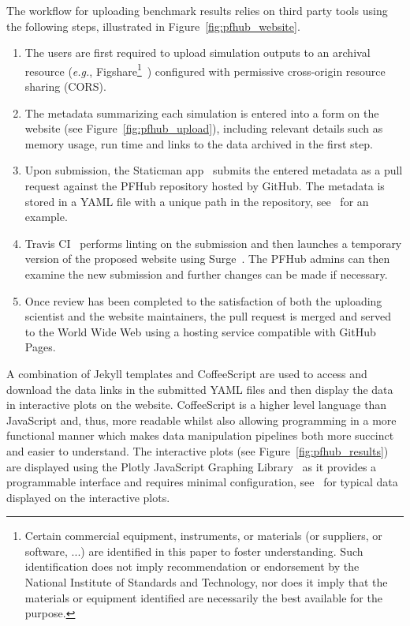 \documentclass{jors}
\begin{document}
The workflow for uploading benchmark results relies on third party
tools using the following steps, illustrated in
Figure~\ref{fig:pfhub_website}.
\begin{enumerate}
  \item The users are first required to upload simulation outputs to
    an archival resource (\emph{e.g.}, Figshare\footnote{Certain
      commercial equipment, instruments, or materials (or suppliers,
      or software, ...) are identified in this paper to foster
      understanding. Such identification does not imply recommendation
      or endorsement by the National Institute of Standards and
      Technology, nor does it imply that the materials or equipment
      identified are necessarily the best available for the
      purpose.\label{disclaimer}}~\cite{figshare}) configured with
    permissive cross-origin resource sharing (CORS).
  \item The metadata summarizing each simulation is entered into a
    form on the website (see Figure~\ref{fig:pfhub_upload}), including
    relevant details such as memory usage, run time and links to the
    data archived in the first step.
  \item Upon submission, the Staticman app~\cite{staticman} submits
    the entered metadata as a pull request against the PFHub
    repository hosted by GitHub. The metadata is stored in a YAML file
    with a unique path in the repository, see~\cite{upload_data} for
    an example.
  \item Travis CI~\cite{travis} performs linting on the submission and
    then launches a temporary version of the proposed website using
    Surge~\cite{surge}. The PFHub admins can then examine the new
    submission and further changes can be made if necessary.
  \item Once review has been completed to the satisfaction of both the
    uploading scientist and the website maintainers, the pull request
    is merged and served to the World Wide Web using a hosting service
    compatible with GitHub Pages.
\end{enumerate}
A combination of Jekyll templates and CoffeeScript are used to access
and download the data links in the submitted YAML files and then
display the data in interactive plots on the website. CoffeeScript is
a higher level language than JavaScript and, thus, more readable
whilst also allowing programming in a more functional manner which
makes data manipulation pipelines both more succinct and easier to
understand. The interactive plots (see Figure~\ref{fig:pfhub_results})
are displayed using the Plotly JavaScript Graphing
Library~\cite{plotly} as it provides a programmable interface and
requires minimal configuration, see~\cite{display_data} for typical
data displayed on the interactive plots.
\end{document}
